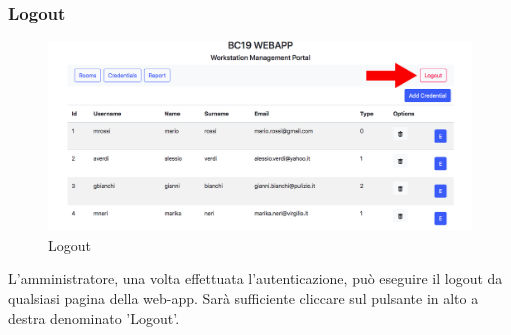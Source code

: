 \subsubsection{Logout}
\begin{figure}[H]
	\centering
	\includegraphics[width=15cm]{res/images/logout.jpg}
	\caption{Logout}
\end{figure}
L'amministratore, una volta effettuata l'autenticazione, può eseguire il logout da qualsiasi pagina della web-app. Sarà sufficiente cliccare sul pulsante in alto a destra denominato 'Logout'.

